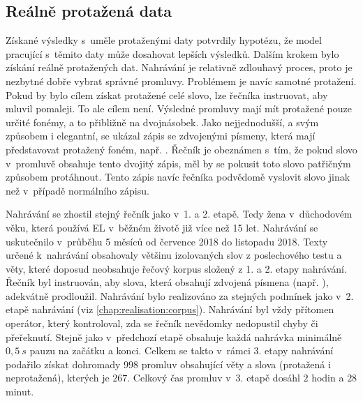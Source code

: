 
\subsection{Reálně protažená data}
\label{chap:realisation:augmentation:real}

Získané výsledky s~uměle protaženými daty potvrdily hypotézu, že model pracující s~těmito daty může dosahovat lepších výsledků.
Dalším krokem bylo získání reálně protažených dat.
Nahrávání je relativně zdlouhavý proces,
proto je nezbytné dobře vybrat správné promluvy.
Problémem je navíc samotné protažení.
Pokud by bylo cílem získat protažené celé slovo, lze řečníka instruovat, aby mluvil pomaleji.
To ale cílem není.
Výsledné promluvy mají mít protažené pouze určité fonémy, a to přibližně na dvojnásobek.
Jako nejjednodušší, a svým způsobem i elegantní, se ukázal zápis se zdvojenými písmeny, která mají představovat protažený foném, např. .
Řečník je obeznámen s~tím, že pokud slovo v~promluvě obsahuje tento dvojitý zápis, měl by se pokusit toto slovo patřičným způsobem protáhnout.
Tento zápis navíc řečníka podvědomě  vyslovit slovo jinak než v~případě normálního zápisu.

Nahrávání se zhostil stejný řečník jako v~1. a 2. etapě.
Tedy žena v~důchodovém věku, která používá EL v~běžném životě již více než 15 let.
Nahrávání se uskutečnilo v~průběhu 5 měsíců od července 2018 do listopadu 2018.
Texty určené  k~nahrávání obsahovaly většinu izolovaných slov z poslechového testu a věty, které doposud neobsahuje řečový korpus složený z 1. a 2. etapy nahrávání.
Řečník byl instruován, aby slova, která obsahují zdvojená písmena (např. ), adekvátně prodloužil.
Nahrávání bylo realizováno za stejných podmínek jako v~2. etapě nahrávání (viz \ref{chap:realisation:corpus}).
Nahrávání byl vždy přítomen operátor, který kontroloval, zda se řečník nevědomky nedopustil chyby či přeřeknutí.
Stejně jako v~předchozí etapě obsahuje každá nahrávka minimálně $0,5\ s$ pauzu na začátku a konci.
Celkem se takto v~rámci 3. etapy nahrávání podařilo získat dohromady $998$ promluv obsahující věty a slova (protažená i neprotažená), kterých je $267$.
Celkový čas promluv v~3. etapě dosáhl $2$ hodin a $28$ minut.

